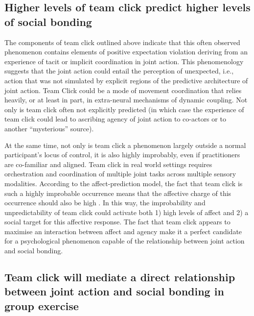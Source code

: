 \begin{CJK}{UTF8}{gbsn}
\subsection{Higher levels of team click predict higher levels of social bonding}

The components of team click outlined above indicate that this often observed phenomenon contains elements of positive expectation violation deriving from an experience of tacit or implicit coordination in joint action.  This phenomenology suggests that the joint action could entail the perception of unexpected, i.e., action that was not simulated by explicit regions of the predictive architecture of joint action.  Team Click could be a mode of movement coordination that relies heavily, or at least in part, in extra-neural mechanisms of dynamic coupling.  Not only is team click often not explicitly predicted (in which case the experience of team click could lead to ascribing agency of joint action to co-actors or to another ``mysterious'' source).

At the same time, not only is team click a phenomenon largely outside a normal participant's locus of control, it is also highly improbably, even if practitioners are co-familiar and aligned.  Team click in real world settings requires orchestration and coordination of multiple joint tasks across multiple sensory modalities.
According to the affect-prediction model, the fact that team click is such a highly improbable occurrence means that the affective charge of this occurrence should also be high \citep{Chetverikov2016}.  In this way, the improbability and unpredictability of team click could activate both 1) high levels of affect and 2) a social target for this affective response.  The fact that team click appears to maximise an interaction between affect and agency make it a perfect candidate for a psychological phenomenon capable of the relationship between joint action and social bonding.




\subsection{Team click will mediate a direct relationship between joint action and social bonding in group exercise}







\end{CJK}
